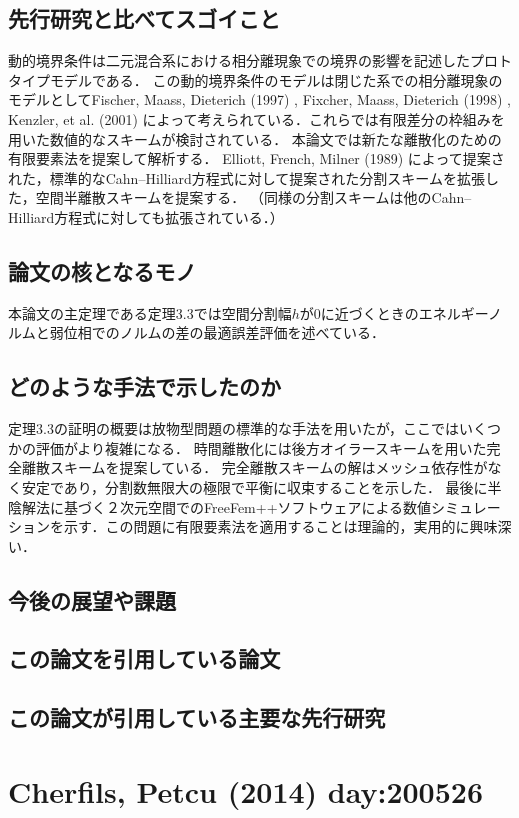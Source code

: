 \documentclass[openary, a4paper, oneside]{jsarticle}
\begin{document}
  \subsection{先行研究と比べてスゴイこと}
  動的境界条件は二元混合系における相分離現象での境界の影響を記述したプロトタイプモデルである．
  この動的境界条件のモデルは閉じた系での相分離現象のモデルとしてFischer, Maass, Dieterich (1997) \cite{FischerMaassDieterich1997}, Fixcher, Maass, Dieterich (1998) \cite{FischerMaassDieterich1998}, Kenzler, et al. (2001) \cite{KenzlerETAL2001}によって考えられている．これらでは有限差分の枠組みを用いた数値的なスキームが検討されている．
  本論文では新たな離散化のための有限要素法を提案して解析する．
  Elliott, French, Milner (1989) \cite{ElliottFrenchMilner1989}によって提案された，標準的なCahn--Hilliard方程式に対して提案された分割スキームを拡張した，空間半離散スキームを提案する．
  （同様の分割スキームは他のCahn--Hilliard方程式に対しても拡張されている．）
  \subsection{論文の核となるモノ}
  本論文の主定理である定理3.3では空間分割幅$h$が0に近づくときのエネルギーノルムと弱位相でのノルムの差の最適誤差評価を述べている．
  \subsection{どのような手法で示したのか}
  定理3.3の証明の概要は放物型問題の標準的な手法を用いたが，ここではいくつかの評価がより複雑になる．
  時間離散化には後方オイラースキームを用いた完全離散スキームを提案している．
  完全離散スキームの解はメッシュ依存性がなく安定であり，分割数無限大の極限で平衡に収束することを示した．
  最後に半陰解法に基づく２次元空間でのFreeFem++ソフトウェアによる数値シミュレーションを示す．この問題に有限要素法を適用することは理論的，実用的に興味深い．
  \subsection{今後の展望や課題}
  \subsection{この論文を引用している論文}
  \subsection{この論文が引用している主要な先行研究}

\newpage
\section{Cherfils, Petcu (2014) day:200526}
\end{document}
